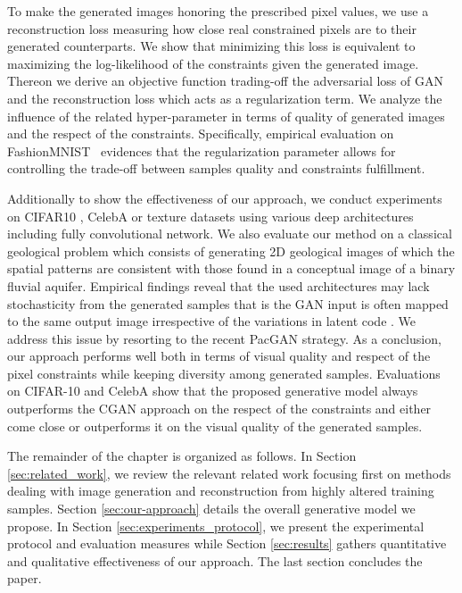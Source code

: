 To make the generated images honoring the prescribed pixel values, we use a reconstruction loss measuring how close real constrained pixels are to their generated counterparts. We show that minimizing this loss is equivalent to maximizing the log-likelihood of the constraints given the generated image. Thereon we derive an objective function trading-off the adversarial loss of GAN and the reconstruction loss which acts as a regularization term. We analyze the influence of the related hyper-parameter in terms of quality of generated images and the respect of the constraints. Specifically, empirical evaluation on FashionMNIST~\citep{Xiao2017} evidences that the regularization parameter allows for controlling the trade-off between samples quality and constraints fulfillment.

Additionally to show the effectiveness of our approach, we conduct experiments on CIFAR10 \citep{Krizhevsky2009}, CelebA \citep{Liu2015} or texture \citep{Jetchev2017} datasets using various deep architectures including fully convolutional network. We also evaluate our method on a classical geological problem which consists of generating 2D geological images of which the spatial patterns are consistent with those found in a conceptual image of a binary fluvial aquifer\citep{Strebelle2002}\citep{Laloy2018}. Empirical findings reveal that the used architectures may lack stochasticity from the generated samples that is the GAN input is often mapped to the same output image irrespective of the variations in latent code \citep{Yang2019}. We address this issue by resorting to the recent PacGAN \citep{Lin2018} strategy.
As a conclusion, our approach performs well both in terms of visual quality and respect of the pixel constraints while keeping diversity among generated samples. Evaluations on CIFAR-10 and CelebA show that the proposed generative model always outperforms the CGAN approach on the respect of the constraints and either come close or outperforms it on the visual quality of the generated samples.

The remainder of the chapter is organized as follows. In Section \ref{sec:related_work}, we review the relevant related  work focusing first on methods dealing with image generation and reconstruction from highly altered training samples.  Section \ref{sec:our-approach}  details the overall generative model we propose. In Section \ref{sec:experiments_protocol}, we present the experimental protocol and evaluation measures while Section \ref{sec:results} gathers quantitative and qualitative effectiveness of our approach. The last section concludes the paper.


